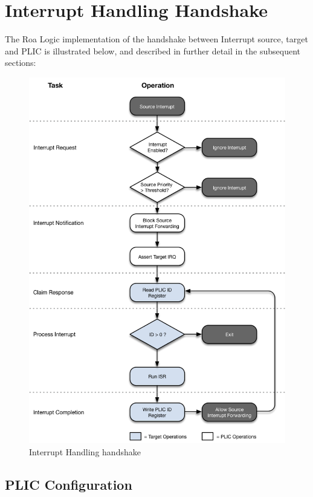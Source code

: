\section{Interrupt Handling Handshake}

The Roa Logic implementation of the handshake between Interrupt source,
target and PLIC is illustrated below, and described in further detail in
the subsequent sections:

\begin{figure}[!htb]

\includegraphics{assets/img/plic-handshake}
\caption{Interrupt Handling handshake}
\label{fig:HANDSHAKE}
\end{figure}

\subsection{PLIC Configuration}

